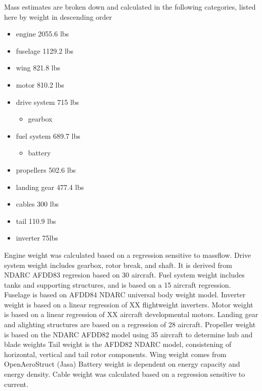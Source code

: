 

Mass estimates are broken down and calculated in the following categories,
listed here by weight in descending order

\begin{itemize}

    \item engine  2055.6 lbs
    \item fuselage 1129.2 lbs
    \item wing 821.8 lbs
    \item motor 810.2 lbs
    \item drive system 715 lbs
        \begin{itemize}
            \item gearbox
        \end{itemize}
    \item fuel system 689.7 lbs
        \begin{itemize}
            \item battery
        \end{itemize}
    \item propellers 502.6 lbs
    \item landing gear 477.4 lbs
    \item cables 300 lbs
    \item tail 110.9 lbs
    \item inverter 75lbs
\end{itemize}

Engine weight was calculated based on a regression sensitive to massflow.
Drive system weight includes gearbox, rotor break, and shaft. It is derived from NDARC AFDD83 regresion based on 30 aircraft.
Fuel system weight includes tanks and supporting structures, and is based on a 15 aircraft regression.
Fuselage is based on AFDD84 NDARC universal body weight model.
Inverter weight is based on a linear regression of XX flightweight inverters.
Motor weight is based on a linear regression of XX aircraft developmental motors.
Landing gear and alighting structures are based on a regression of 28 aircraft.
Propeller weight is based on the NDARC AFDD82 model using 35 aircraft to determine hub and blade weights
Tail weight is the AFDD82 NDARC model, consistening of horizontal, vertical and tail rotor components.
Wing weight comes from OpenAeroStruct (Jasa)
Battery weight is dependent on energy capacity and energy density.
Cable weight was calculated based on a regression sensitive to current.

\cite{NDARC}

